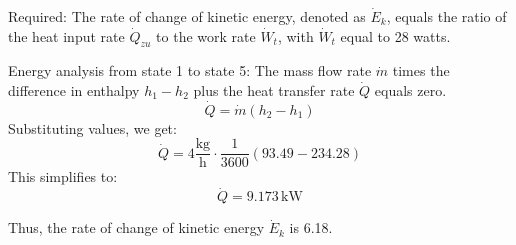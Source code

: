 Required: The rate of change of kinetic energy, denoted as \(\dot{E}_k\), equals the ratio of the heat input rate \(\dot{Q}_{zu}\) to the work rate \(\dot{W}_t\), with \(\dot{W}_t\) equal to 28 watts.

Energy analysis from state 1 to state 5: The mass flow rate \(\dot{m}\) times the difference in enthalpy \(h_1 - h_2\) plus the heat transfer rate \(\dot{Q}\) equals zero.
\[
\dot{Q} = \dot{m} (h_2 - h_1)
\]
Substituting values, we get:
\[
\dot{Q} = 4 \frac{\text{kg}}{\text{h}} \cdot \frac{1}{3600} \left( 93.49 - 234.28 \right)
\]
This simplifies to:
\[
\dot{Q} = 9.173 \, \text{kW}
\]

Thus, the rate of change of kinetic energy \(\dot{E}_k\) is 6.18.